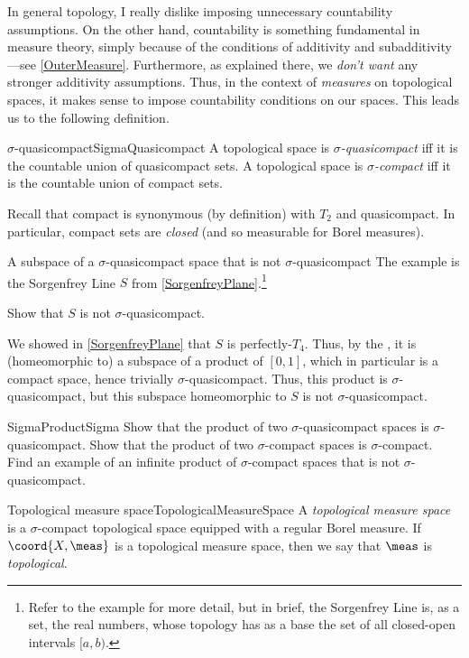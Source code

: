 In general topology, I really dislike imposing unnecessary countability assumptions.  On the other hand, countability is something fundamental in measure theory, simply because of the conditions of additivity and subadditivity---see \cref{OuterMeasure}.  Furthermore, as explained there, we \emph{don't want} any stronger additivity assumptions.  Thus, in the context of \emph{measures} on topological spaces, it makes sense to impose countability conditions on our spaces.  This leads us to the following definition.
\begin{dfn}{$\sigma$-quasicompact}{SigmaQuasicompact}
A topological space is \emph{$\sigma$-quasicompact} iff it is the countable union of quasicompact sets.  A topological space is \emph{$\sigma$-compact} iff it is the countable union of compact sets.
\begin{rmk}
Recall that compact is synonymous (by definition) with $T_2$ and quasicompact.  In particular, compact sets are \emph{closed} (and so measurable for Borel measures).
\end{rmk}
\end{dfn}
\begin{exm}{A subspace of a $\sigma$-quasicompact space that is not $\sigma$-quasicompact}{}
The example is the Sorgenfrey Line $S$ from \cref{SorgenfreyPlane}.\footnote{Refer to the example for more detail, but in brief, the Sorgenfrey Line is, as a set, the real numbers, whose topology has as a base the set of all closed-open intervals $[a,b)$.}
\begin{exr}{}{}
Show that $S$ is not $\sigma$-quasicompact.
\end{exr}

We showed in \cref{SorgenfreyPlane} that $S$ is perfectly-$T_4$.  Thus, by the , it is (homeomorphic to) a subspace of a product of $[0,1]$, which in particular is a compact space, hence trivially $\sigma$-quasicompact.  Thus, this product is $\sigma$-quasicompact, but this subspace homeomorphic to $S$ is not $\sigma$-quasicompact.
\end{exm}
\begin{exr}{}{SigmaProductSigma}
Show that the product of two $\sigma$-quasicompact spaces is $\sigma$-quasicompact.  Show that the product of two $\sigma$-compact spaces is $\sigma$-compact.  Find an example of an infinite product of $\sigma$-compact spaces that is not $\sigma$-quasicompact.
\end{exr}
\begin{dfn}{Topological measure space}{TopologicalMeasureSpace}
A \emph{topological measure space} is a $\sigma$-compact topological space equipped with a regular Borel measure.  If $\coord{X,\meas}$ is a topological measure space, then we say that $\meas$ is \emph{topological}.
\end{dfn}

